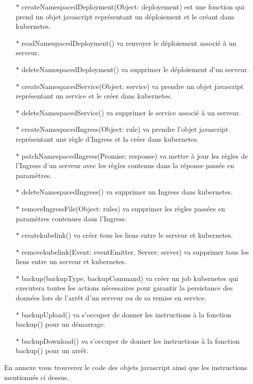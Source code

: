 \documentclass{article}
\begin{document}
\begin{itemize}
	\item[$\ast$]createNamespacedDeployment(Object: deployement) est une fonction qui prend un objet javascript représentant un déploiement et le créant dans kubernetes.
	\item[$\ast$]readNamespacedDeployment() va renvoyer le déploiement associé à un serveur.
	\item[$\ast$]deleteNamespacedDeployment() va supprimer le déploiement d'un serveur.
	\item[$\ast$]createNamespacedService(Object: service) va prendre un objet javascript représentant un service et le créer dans kubernetes.
	\item[$\ast$]deleteNamespacedService() va supprimer le service associé à un serveur.
	\item[$\ast$]createNamespacedIngress(Object: rule) va prendre l'objet javascript représentant une règle d'Ingress et la créer dans kubernetes.
	\item[$\ast$]patchNamespacedIngress(Promise: response) va mettre à jour les règles de l'Ingress d'un serveur avec les règles contenus dans la réponse passée en paramètres.
	\item[$\ast$]deleteNamespacedIngress() va supprimer un Ingress dans kubernetes.
	\item[$\ast$]removeIngressFile(Object: rules) va supprimer les règles passées en paramètres contenues dans l'Ingress.
	\item[$\ast$]createkubelink() va créer tous les liens entre le serveur et kubernetes.
	\item[$\ast$]removekubelink(Event: eventEmitter, Server: server) va supprimer tous les liens entre un serveur et kubernetes.
	\item[$\ast$]backup(backupType, backupCommand) va créer un job kubernetes qui executera toutes les actions nécessaires pour garantir la persistance des données lors de l'arrêt d'un serveur ou de sa remise en service.
	\item[$\ast$]backupUpload() va s'occuper de donner les instructions à la fonction backup() pour un démarrage.
	\item[$\ast$]backupDownload() va s'occuper de donner les instructions à la fonction backup() pour un arrêt.
\end{itemize}
En annexe vous trouverez le code des objets javascript ainsi que les instructions mentionnés ci dessus.

\newpage
\end{document}
